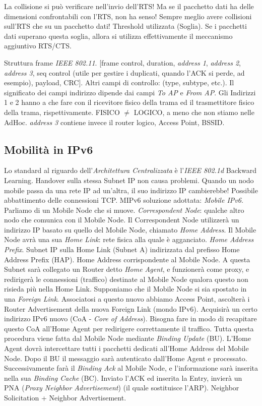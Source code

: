 La collisione si può verificare nell'invio dell'RTS! Ma se il pacchetto dati ha delle dimensioni confrontabili con l'RTS, non ha senso! Sempre meglio avere collisioni sull'RTS che su un pacchetto dati! Threshold utilizzata (Soglia). Se i pacchetti dati superano questa soglia, allora si utilizza effettivamente il meccanismo aggiuntivo RTS/CTS. 

Struttura frame \textit{IEEE 802.11}. [frame control, duration, \textit{address 1}, \textit{address 2}, \textit{address 3}, seq control (utile per gestire i duplicati, quando l'ACK si perde, ad esempio), payload, CRC]. Altri campi di controllo: (type, subtype, etc.). Il significato dei campi indirizzo dipende dai campi \textit{To AP} e \textit{From AP}. Gli Indirizzi 1 e 2 hanno a che fare con il ricevitore fisico della trama ed il trasmettitore fisico della trama, rispettivamente. FISICO $\neq$ LOGICO, a meno che non stiamo nelle AdHoc. \textit{address 3} contiene invece il router logico, Access Point, BSSID.

\subsection{Mobilità in IPv6}

Lo standard al riguardo dell'\textit{Architettura Centralizzata} è l'\textit{IEEE 802.1d} Backward Learning. Handover sulla stessa Subnet IP non causa problemi. Quando un nodo mobile passa da una rete IP ad un'altra, il suo indirizzo IP cambierebbe! Possibile abbattimento delle connessioni TCP. MIPv6 soluzione adottata: \textit{Mobile IPv6}. Parliamo di un Mobile Node che si muove. \textit{Correspondent Node}: qualche altro nodo che comunica con il Mobile Node. Il Correspondent Node utilizzerà un indirizzo IP basato su quello del Mobile Node, chiamato \textit{Home Address}. Il Mobile Node avrà una sua \textit{Home Link}: rete fisica alla quale è agganciato. \textit{Home Address Prefix}. Subnet IP sulla Home Link (Subnet A) indirizzata dal prefisso Home Address Prefix (HAP). Home Address corrispondente al Mobile Node. A questa Subnet sarà collegato un Router detto \textit{Home Agent}, e funzionerà come proxy, e redirigerà le connessioni (traffico) destinate al Mobile Node qualora questo non risieda più nella Home Link. Supponiamo che il Mobile Node si sia spostato in una \textit{Foreign Link}. Associatosi a questo nuovo abbiamo Access Point, ascolterà i Router Advertisement della nuova Foreign Link (mondo IPv6). Acquisirà un certo indirizzo IPv6 nuovo (CoA - \textit{Core of Address}). Bisogna fare in modo di recapitare questo CoA all'Home Agent per redirigere correttamente il traffico. Tutta questa procedura viene fatta dal Mobile Node mediante \textit{Binding Update} (BU). L'Home Agent dovrà intercettare tutti i pacchetti dedicati all'Home Address del Mobile Node. Dopo il BU il messaggio sarà autenticato dall'Home Agent e processato. Successivamente farà il \textit{Binding Ack} al Mobile Node, e l'informazione sarà inserita nella sua \textit{Binding Cache} (BC). Inviato l'ACK ed inserita la Entry, invierà un PNA (\textit{Proxy Neighbor Advertisement}) (il quale sostituisce l'ARP). Neighbor Solicitation + Neighbor Advertisement.

